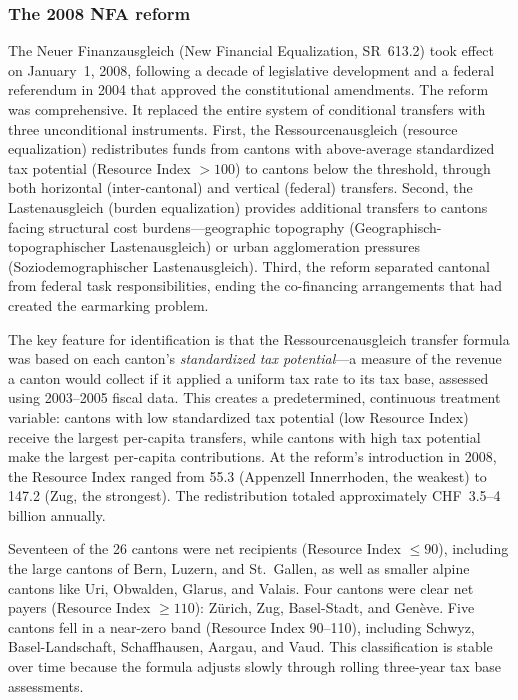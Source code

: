 \documentclass[12pt]{article}
\begin{document}
\subsubsection*{The 2008 NFA reform} The Neuer Finanzausgleich (New Financial Equalization, SR~613.2) took effect on January~1, 2008, following a decade of legislative development and a federal referendum in 2004 that approved the constitutional amendments. The reform was comprehensive. It replaced the entire system of conditional transfers with three unconditional instruments. First, the Ressourcenausgleich (resource equalization) redistributes funds from cantons with above-average standardized tax potential (Resource Index $> 100$) to cantons below the threshold, through both horizontal (inter-cantonal) and vertical (federal) transfers. Second, the Lastenausgleich (burden equalization) provides additional transfers to cantons facing structural cost burdens---geographic topography (Geographisch-topographischer Lastenausgleich) or urban agglomeration pressures (Soziodemographischer Lastenausgleich). Third, the reform separated cantonal from federal task responsibilities, ending the co-financing arrangements that had created the earmarking problem.

The key feature for identification is that the Ressourcenausgleich transfer formula was based on each canton's \emph{standardized tax potential}---a measure of the revenue a canton would collect if it applied a uniform tax rate to its tax base, assessed using 2003--2005 fiscal data. This creates a predetermined, continuous treatment variable: cantons with low standardized tax potential (low Resource Index) receive the largest per-capita transfers, while cantons with high tax potential make the largest per-capita contributions. At the reform's introduction in 2008, the Resource Index ranged from 55.3 (Appenzell Innerrhoden, the weakest) to 147.2 (Zug, the strongest). The redistribution totaled approximately CHF~3.5--4 billion annually.

Seventeen of the 26 cantons were net recipients (Resource Index $\leq 90$), including the large cantons of Bern, Luzern, and St.~Gallen, as well as smaller alpine cantons like Uri, Obwalden, Glarus, and Valais. Four cantons were clear net payers (Resource Index $\geq 110$): Zürich, Zug, Basel-Stadt, and Genève. Five cantons fell in a near-zero band (Resource Index 90--110), including Schwyz, Basel-Landschaft, Schaffhausen, Aargau, and Vaud. This classification is stable over time because the formula adjusts slowly through rolling three-year tax base assessments.
\end{document}
